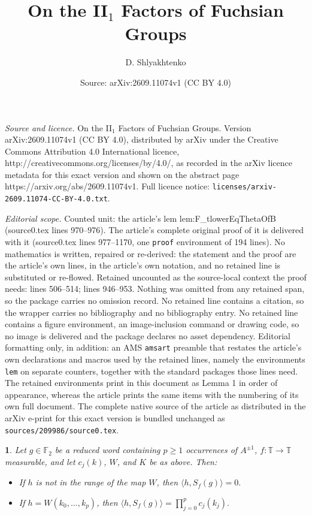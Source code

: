 \documentclass[10pt,a4paper]{amsart}
\title{On the II$_{1}$ Factors of Fuchsian Groups}
\author{D. Shlyakhtenko}
\date{Source: arXiv:2609.11074v1 (CC BY 4.0)}
\newtheorem{lem}{}
\begin{document}
\maketitle

\noindent\emph{Source and licence.} On the II$_{1}$ Factors of Fuchsian Groups. Version arXiv:2609.11074v1 (CC BY 4.0), distributed by arXiv under the Creative Commons Attribution 4.0 International licence, http://creativecommons.org/licenses/by/4.0/, as recorded in the arXiv licence metadata for this exact version and shown on the abstract page https://arxiv.org/abs/2609.11074v1. Full licence notice: \texttt{licenses/arxiv-2609.11074-CC-BY-4.0.txt}.\par\smallskip

\noindent\textit{Editorial scope.} Counted unit: the article's lem lem:F\_tlowerEqThetaOfB (source0.tex lines 970--976). The article's complete original proof of it is delivered with it (source0.tex lines 977--1170, one \texttt{proof} environment of 194 lines). No mathematics is written, repaired or re-derived: the statement and the proof are the article's own lines, in the article's own notation, and no retained line is substituted or re-flowed.  Retained uncounted as the source-local context the proof needs: lines 506--514; lines 946--953.  Nothing was omitted from any retained span, so the package carries no omission record.  No retained line contains a citation, so the wrapper carries no bibliography and no bibliography entry.  No retained line contains a figure environment, an image-inclusion command or drawing code, so no image is delivered and the package declares no asset dependency.  Editorial formatting only, in addition: an AMS \texttt{amsart} preamble that restates the article's own declarations and macros used by the retained lines, namely the environments \texttt{lem} on separate counters, together with the standard packages those lines need.  The retained environments print in this document as Lemma 1 in order of appearance, whereas the article prints the same items with the numbering of its own full document.  The complete native source of the article as distributed in the arXiv e-print for this exact version is bundled unchanged as \texttt{sources/209986/source0.tex}.
\begin{lem}
\label{lem:descriptionOfSfWords}Let $g\in\mathbb{F}_{2}$ be a reduced
word containing $p\geq1$ occurrences of $A^{\pm1}$, $f:\mathbb{\mathbb{T}\to\mathbb{T}}$
measurable, and let $c_{j}(k)$, $W$, and $K$ be as above. Then:
\begin{itemize}
\item If $h$ is not in the range of the map $W$, then $\langle h,S_{f}(g)\rangle=0.$
\item If $h=W(k_{0},\dots,k_{p})$, then $\langle h,S_{f}(g)\rangle=\prod_{j=0}^{p}c_{j}(k_{j}).$
\end{itemize}
\end{lem}
\end{document}
